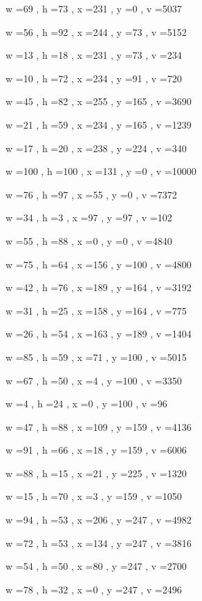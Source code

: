 \documentclass[11pt]{article}
\begin{document}
w =69 , h =73 , x =231 , y =0 , v =5037
\par
w =56 , h =92 , x =244 , y =73 , v =5152
\par
w =13 , h =18 , x =231 , y =73 , v =234
\par
w =10 , h =72 , x =234 , y =91 , v =720
\par
w =45 , h =82 , x =255 , y =165 , v =3690
\par
w =21 , h =59 , x =234 , y =165 , v =1239
\par
w =17 , h =20 , x =238 , y =224 , v =340
\par
w =100 , h =100 , x =131 , y =0 , v =10000
\par
w =76 , h =97 , x =55 , y =0 , v =7372
\par
w =34 , h =3 , x =97 , y =97 , v =102
\par
w =55 , h =88 , x =0 , y =0 , v =4840
\par
w =75 , h =64 , x =156 , y =100 , v =4800
\par
w =42 , h =76 , x =189 , y =164 , v =3192
\par
w =31 , h =25 , x =158 , y =164 , v =775
\par
w =26 , h =54 , x =163 , y =189 , v =1404
\par
w =85 , h =59 , x =71 , y =100 , v =5015
\par
w =67 , h =50 , x =4 , y =100 , v =3350
\par
w =4 , h =24 , x =0 , y =100 , v =96
\par
w =47 , h =88 , x =109 , y =159 , v =4136
\par
w =91 , h =66 , x =18 , y =159 , v =6006
\par
w =88 , h =15 , x =21 , y =225 , v =1320
\par
w =15 , h =70 , x =3 , y =159 , v =1050
\par
w =94 , h =53 , x =206 , y =247 , v =4982
\par
w =72 , h =53 , x =134 , y =247 , v =3816
\par
w =54 , h =50 , x =80 , y =247 , v =2700
\par
w =78 , h =32 , x =0 , y =247 , v =2496
\par
\newpage
\end{document}
